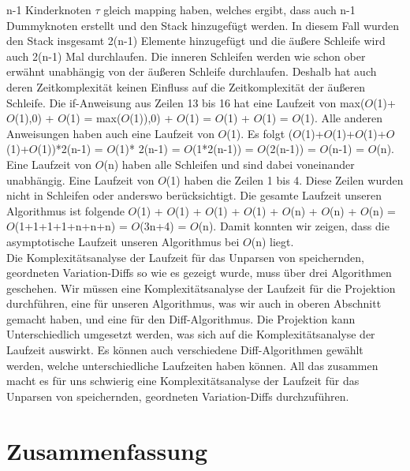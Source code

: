 n-1 Kinderknoten $\tau$ gleich mapping haben, welches ergibt, dass auch n-1 Dummyknoten erstellt und den Stack hinzugefügt werden. In diesem Fall wurden den Stack insgesamt 2(n-1) Elemente hinzugefügt und die äußere Schleife wird auch 2(n-1) Mal durchlaufen. Die inneren Schleifen werden wie schon ober erwähnt unabhängig von der äußeren Schleife durchlaufen. Deshalb hat auch deren Zeitkomplexität keinen Einfluss auf die Zeitkomplexität der äußeren Schleife. Die if-Anweisung aus Zeilen 13 bis 16 hat eine Laufzeit von max($O$(1)+$O$(1),0) + $O$(1) = max($O$(1)),0) + $O$(1) = $O$(1) + $O$(1) = $O$(1). Alle anderen Anweisungen haben auch eine Laufzeit von $O$(1). Es folgt ($O$(1)+$O$(1)+$O$(1)+$O$(1)+$O$(1))*2(n-1) = $O$(1)* 2(n-1) = $O$(1*2(n-1)) = $O$(2(n-1)) = $O$(n-1) = $O$(n). Eine Laufzeit von $O$(n) haben alle Schleifen und sind dabei voneinander unabhängig. Eine Laufzeit von $O$(1) haben die Zeilen 1 bis 4. Diese Zeilen wurden nicht in Schleifen oder anderswo berücksichtigt. Die gesamte Laufzeit unseren Algorithmus ist folgende $O$(1) + $O$(1) + $O$(1) + $O$(1) + $O$(n) + $O$(n) + $O$(n) = $O$(1+1+1+1+n+n+n) = $O$(3n+4) = $O$(n). Damit konnten wir zeigen, dass die asymptotische Laufzeit unseren Algorithmus bei $O$(n) liegt.\\

Die Komplexitätsanalyse der Laufzeit für das Unparsen von speichernden, geordneten Variation-Diffs so wie es gezeigt wurde, muss über drei Algorithmen geschehen. Wir müssen eine Komplexitätsanalyse der Laufzeit für die Projektion durchführen, eine für unseren Algorithmus, was wir auch in oberen Abschnitt gemacht haben, und eine für den Diff-Algorithmus. Die Projektion kann Unterschiedlich umgesetzt werden, was sich auf die Komplexitätsanalyse der Laufzeit auswirkt. Es können auch verschiedene Diff-Algorithmen gewählt werden, welche unterschiedliche Laufzeiten haben können. All das zusammen macht es für uns schwierig eine Komplexitätsanalyse der Laufzeit für das Unparsen von speichernden, geordneten Variation-Diffs durchzuführen. 

\section{Zusammenfassung}

